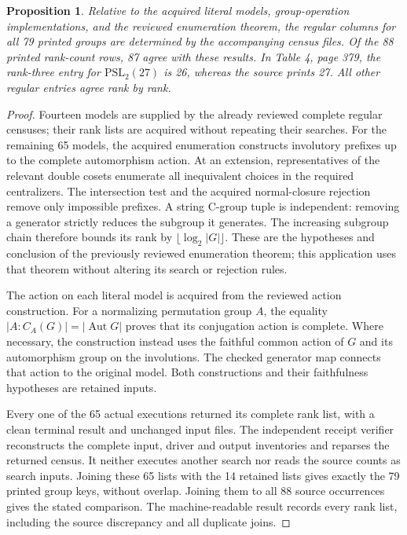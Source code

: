\documentclass[10pt]{article}
\newtheorem{proposition}{Proposition}
\begin{document}
\begin{proposition}
Relative to the acquired literal models, group-operation implementations,
and the reviewed enumeration theorem, the regular columns for all 79
printed groups are determined by the accompanying census files. Of the
88 printed rank-count rows, 87 agree with these results. In Table 4,
page 379, the rank-three entry for $\mathrm{PSL}_2(27)$ is 26, whereas
the source prints 27. All other regular entries agree rank by rank.
\end{proposition}
\begin{proof}
Fourteen models are supplied by the already reviewed complete regular
censuses; their rank lists are acquired without repeating their searches.
For the remaining 65 models, the acquired enumeration constructs
involutory prefixes up to the complete automorphism action. At an
extension, representatives of the relevant double cosets enumerate all
inequivalent choices in the required centralizers. The intersection test
and the acquired normal-closure rejection remove only impossible prefixes.
A string C-group tuple is independent: removing a generator strictly
reduces the subgroup it generates. The increasing subgroup chain therefore
bounds its rank by $\lfloor\log_2|G|\rfloor$. These are the hypotheses and
conclusion of the previously reviewed enumeration theorem; this application
uses that theorem without altering its search or rejection rules.

The action on each literal model is acquired from the reviewed action
construction. For a normalizing permutation group $A$, the equality
$|A:C_A(G)|=|\operatorname{Aut}G|$ proves that its conjugation action is
complete. Where necessary, the construction instead uses the faithful
common action of $G$ and its automorphism group on the involutions.
The checked generator map connects that action to the original model.
Both constructions and their faithfulness hypotheses are retained inputs.

Every one of the 65 actual executions returned its complete rank list,
with a clean terminal result and unchanged input files. The independent
receipt verifier reconstructs the complete input, driver and output
inventories and reparses the returned census. It neither executes another
search nor reads the source counts as search inputs. Joining these 65
lists with the 14 retained lists gives exactly the 79 printed group keys,
without overlap. Joining them to all 88 source occurrences gives the
stated comparison. The machine-readable result records every rank list,
including the source discrepancy and all duplicate joins.
\end{proof}
\end{document}
